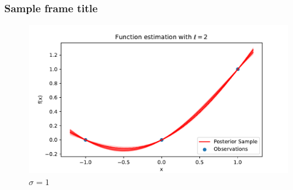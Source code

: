 \documentclass{beamer}
\begin{document}
\begin{frame}
    \frametitle{Sample frame title}
    \begin{figure}
        \centering
        \includegraphics[width=\textwidth]{flatish_GP_ell_20_tenths.pdf}
        \caption{$\sigma = 1$}
    \end{figure}
\end{frame}
\end{document}
